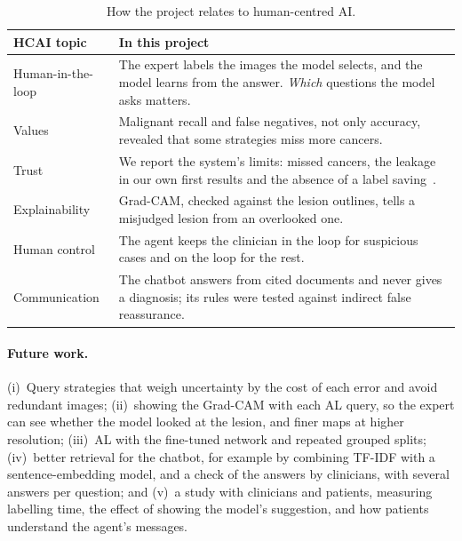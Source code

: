 \documentclass{article}
\begin{document}
\begin{table}[t]
\centering
\small
\setlength{\tabcolsep}{4pt}
\begin{tabular}{@{}p{}p{}@{}}
\toprule
HCAI topic & In this project \\
\midrule
Human-in-the-loop & The expert labels the images the model selects, and the model learns
from the answer. \emph{Which} questions the model asks matters. \\
Values & Malignant recall and false negatives, not only accuracy, revealed that some
strategies miss more cancers. \\
Trust & We report the system's limits: missed cancers, the leakage in our own first
results and the absence of a label saving~\cite{shneiderman2020hcai}. \\
Explainability & Grad-CAM, checked against the lesion outlines, tells a misjudged lesion
from an overlooked one. \\
Human control & The agent keeps the clinician in the loop for suspicious cases and on the
loop for the rest. \\
Communication & The chatbot answers from cited documents and never gives a diagnosis; its rules were tested against indirect false reassurance. \\
\bottomrule
\end{tabular}
\caption{How the project relates to human-centred AI.}
\label{tab:hcai}
\end{table}

\paragraph{Future work.}
(i)~Query strategies that weigh uncertainty by the cost of each error and avoid redundant
images; (ii)~showing the Grad-CAM with each AL query, so the expert
can see whether the model looked at the lesion, and finer maps at higher resolution;
(iii)~AL with the fine-tuned network and repeated grouped splits; (iv)~better retrieval for
the chatbot, for example by combining TF-IDF with a sentence-embedding model, and a check of
the answers by clinicians, with several answers per question; and (v)~a study with
clinicians and patients, measuring labelling time, the effect of showing the model's
suggestion, and how patients understand the agent's messages.

\end{document}

